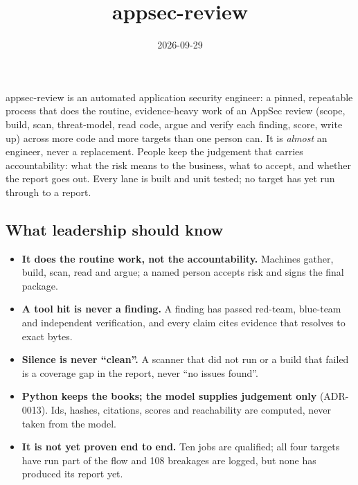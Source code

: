 \documentclass[10pt,a4paper]{article}
\title{appsec-review}
\date{2026-09-29}
\begin{document}
\maketitle
\begin{bluf}
appsec-review is an automated application security engineer: a pinned, repeatable process that does
the routine, evidence-heavy work of an AppSec review (scope, build, scan, threat-model, read code, argue
and verify each finding, score, write up) across more code and more targets than one person can. It is
\emph{almost} an engineer, never a replacement. People keep the judgement that carries accountability:
what the risk means to the business, what to accept, and whether the report goes out. Every lane is
built and unit tested; no target has yet run through to a report.
\end{bluf}


\subsection*{What leadership should know}
\begin{itemize}
\item \textbf{It does the routine work, not the accountability.} Machines gather, build, scan,
read and argue; a named person accepts risk and signs the final package.
\item \textbf{A tool hit is never a finding.} A finding has passed red-team, blue-team and
independent verification, and every claim cites evidence that resolves to exact bytes.
\item \textbf{Silence is never ``clean''.} A scanner that did not run or a build that failed is a
coverage gap in the report, never ``no issues found''.
\item \textbf{Python keeps the books; the model supplies judgement only} (ADR-0013). Ids, hashes,
citations, scores and reachability are computed, never taken from the model.
\item \textbf{It is not yet proven end to end.} Ten jobs are qualified; all four targets have run
part of the flow and 108 breakages are logged, but none has produced its report yet.
\end{itemize}
\end{document}
